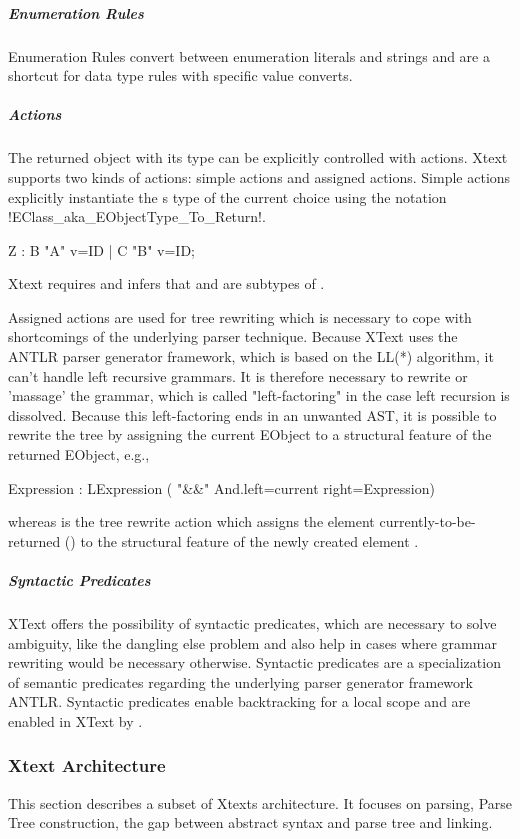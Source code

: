 \subparagraph{Enumeration Rules}
Enumeration Rules convert between enumeration literals and strings and are a shortcut for data type rules with specific value converts.

\subparagraph{Actions}
The returned object with its type can be explicitly controlled with actions. Xtext supports two kinds of actions: simple actions and assigned actions. Simple actions explicitly instantiate the s type of the current choice using the notation \kode!{EClass_aka_EObjectType_To_Return}!.
\begin{xtxt}
Z 	: 	{B} "A" v=ID
	| 	{C} "B" v=ID;
\end{xtxt}
Xtext requires and infers that  and  are subtypes of . 

Assigned actions are used for tree rewriting which is necessary to cope with shortcomings of the underlying parser technique. Because XText uses the ANTLR parser generator framework, which is based on the LL(*) algorithm, it can't handle left recursive grammars. It is therefore necessary to rewrite or 'massage' the grammar, which is called "left-factoring" in the case left recursion is dissolved. Because this left-factoring ends in an unwanted AST, it is possible to rewrite the tree by assigning the current EObject to a structural feature of the returned EObject, e.g., 
\begin{xtxt}
Expression 	: 	LExpression 
	 	( "&&" {And.left=current}  right=Expression)
\end{xtxt}
whereas  is the tree rewrite action which assigns the element currently-to-be-returned () to the structural feature  of the newly created element .


\subparagraph{Syntactic Predicates}
XText offers the possibility of syntactic predicates, which are necessary to solve ambiguity, like the dangling else problem and also help in cases where grammar rewriting would be necessary otherwise. Syntactic predicates are a specialization of semantic predicates regarding the underlying parser generator framework ANTLR. Syntactic predicates enable backtracking for a local scope and are enabled in XText by \code{=>}.


\subsubsection{Xtext Architecture} \label{cha:xtextarch}
This section describes a subset of Xtexts architecture. It focuses on parsing, Parse Tree construction, the gap between abstract syntax and parse tree and linking.


